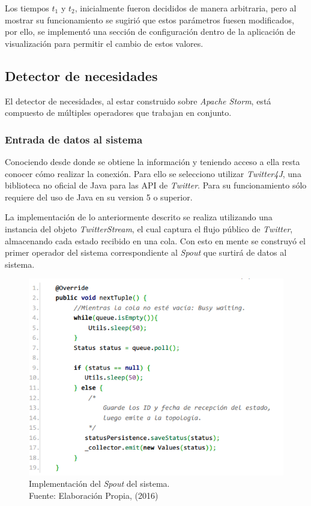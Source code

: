 Los tiempos $t_{1}$ y $t_{2}$, inicialmente fueron decididos de manera arbitraria, pero al mostrar su funcionamiento se sugirió que estos parámetros fuesen modificados, por ello, se implementó una sección de configuración dentro de la aplicación de visualización para permitir el cambio de estos valores.

\subsection{Detector de necesidades}
\label{subsec:detectorNecesidades}

El detector de necesidades, al estar construido sobre \textit{Apache Storm}, está compuesto de múltiples operadores que trabajan en conjunto.

\subsubsection*{Entrada de datos al sistema}
\label{subsubseC:EntradaDeDatos}

Conociendo desde donde se obtiene la información y teniendo acceso a ella resta conocer cómo realizar la conexión. Para ello se selecciono utilizar \textit{Twitter4J}, una biblioteca no oficial de Java para las API de \textit{Twitter}. Para su funcionamiento sólo requiere del uso de Java en su version 5 o superior.

La implementación de lo anteriormente descrito se realiza utilizando una instancia del objeto \textit{TwitterStream}, el cual captura el flujo público de \textit{Twitter}, almacenando cada estado recibido en una cola. Con esto en mente se construyó el primer operador del sistema correspondiente al \textit{Spout} que surtirá de datos al sistema.

\begin{figure}[H]
	\centering
	\captionsetup{justification=centering}
	\includegraphics[scale=0.8]{images/TwitterSpout.png}
	\caption[Implementación del \textit{Spout} del sistema.]{Implementación del \textit{Spout} del sistema.\\Fuente: Elaboración Propia, (2016)}
	\label{fig:TwitterSpout}
\end{figure}

